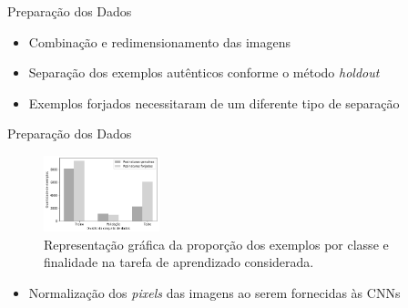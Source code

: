 \begin{frame}{Preparação dos Dados}
  \baselineskip
  \begin{itemize}
    \item Combinação e redimensionamento das imagens
    \bigskip
    \item Separação dos exemplos \alert{autênticos} conforme o método \emph{holdout}
    \item Exemplos \alert{forjados} necessitaram de um diferente tipo de separação
  \end{itemize}

  \begin{table}[h!]
	\centering
	\caption{Quantitativo de exemplos.}
	\label{tab:divisao-dados}
  \end{table}
\end{frame}


\begin{frame}{Preparação dos Dados}
  \begin{figure}[h!]
  \centering
  \caption{Representação gráfica da proporção dos exemplos por classe e finalidade na tarefa de aprendizado considerada.}
  \label{fig:divisao-dados}
  \includegraphics[width=0.3\textwidth]{./img/divisao-dados}
  \end{figure}

  \begin{itemize}
    \item Normalização dos \emph{pixels} das imagens ao serem fornecidas às CNNs
  \end{itemize}
\end{frame}

